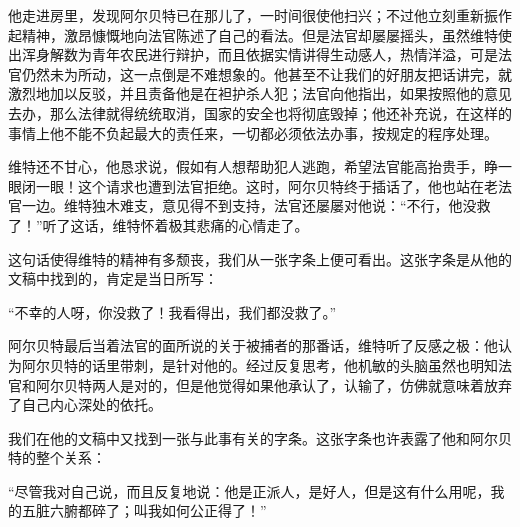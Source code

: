 \documentclass[12pt,oneside]{book}
\begin{document}
\begin{framed}
他走进房里，发现阿尔贝特已在那儿了，一时间很使他扫兴；不过他立刻重新振作起精神，激昂慷慨地向法官陈述了自己的看法。但是法官却屡屡摇头，虽然维特使出浑身解数为青年农民进行辩护，而且依据实情讲得生动感人，热情洋溢，可是法官仍然未为所动，这一点倒是不难想象的。他甚至不让我们的好朋友把话讲完，就激烈地加以反驳，并且责备他是在袒护杀人犯；法官向他指出，如果按照他的意见去办，那么法律就得统统取消，国家的安全也将彻底毁掉；他还补充说，在这样的事情上他不能不负起最大的责任来，一切都必须依法办事，按规定的程序处理。

维特还不甘心，他恳求说，假如有人想帮助犯人逃跑，希望法官能高抬贵手，睁一眼闭一眼！这个请求也遭到法官拒绝。这时，阿尔贝特终于插话了，他也站在老法官一边。维特独木难支，意见得不到支持，法官还屡屡对他说：“不行，他没救了！”听了这话，维特怀着极其悲痛的心情走了。

这句话使得维特的精神有多颓丧，我们从一张字条上便可看出。这张字条是从他的文稿中找到的，肯定是当日所写：
\end{framed}

“不幸的人呀，你没救了！我看得出，我们都没救了。”

\begin{framed}
阿尔贝特最后当着法官的面所说的关于被捕者的那番话，维特听了反感之极：他认为阿尔贝特的话里带刺，是针对他的。经过反复思考，他机敏的头脑虽然也明知法官和阿尔贝特两人是对的，但是他觉得如果他承认了，认输了，仿佛就意味着放弃了自己内心深处的依托。

我们在他的文稿中又找到一张与此事有关的字条。这张字条也许表露了他和阿尔贝特的整个关系：
\end{framed}

“尽管我对自己说，而且反复地说：他是正派人，是好人，但是这有什么用呢，我的五脏六腑都碎了；叫我如何公正得了！”
\end{document}
